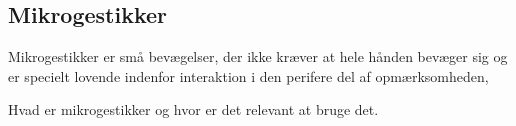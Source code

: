 \subsection{Mikrogestikker}
\label{Mikrogestikker}

Mikrogestikker er små bevægelser, der ikke kræver at hele hånden bevæger sig og er specielt lovende indenfor interaktion i den perifere del af opmærksomheden, \parencite[s. 95]{PDF:PeripheralInteraction}


Hvad er mikrogestikker og hvor er det relevant at bruge det. 